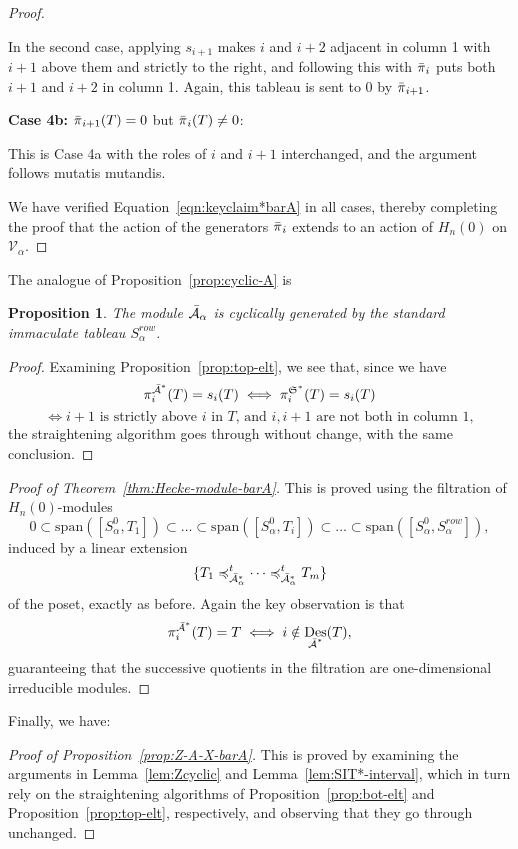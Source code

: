 \documentclass[12pt,letterpaper]{amsart}
\newtheorem{proposition}[theorem]{Proposition}
\theoremstyle{definition}
\newcommand{\dI}{\mathfrak{S}^*}
\DeclareMathOperator{\Des}{Des}
\newcommand{\hn}{H_n(0)}
\begin{document}
\begin{proof}
\begin{enumerate}
In the second case, applying $s_{i+1}$ makes $i$ and $i+2$ adjacent in column 1 with $i+1$ above them and strictly to the right, and following this with $\operatorname{\bar{\pi}}_i$ puts both $i+1$ and $i+2$ in column 1.  Again, this tableau is  sent to 0 by  $\operatorname{\bar{\pi}}_{i+1}$.

\textbf{Case 4b:} $\operatorname{\bar{\pi}}_{i+1}(T)=0$ but $\operatorname{\bar{\pi}}_i(T)\ne 0$:

This is Case 4a with the roles of $i$ and $i+1$ interchanged, and the argument follows mutatis mutandis.


\end{enumerate}
We have verified Equation~\eqref{eqn:keyclaim*barA} in all cases, thereby completing the proof that the action of the generators $\operatorname{\bar{\pi}}_i$ extends to an action of $H_n(0)$ on $\mathcal{V}_\alpha.$ 
\end{proof}    

The analogue of Proposition~\ref{prop:cyclic-A} is 
\begin{proposition}\label{prop:cyclic-barA} The module $\operatorname{\bar{\mathcal{A}}}_\alpha$ is cyclically generated by the standard immaculate tableau $S^{row}_\alpha$.
\end{proposition}
\begin{proof}  Examining  Proposition~\ref{prop:top-elt}, we see that, since we have 
\[\pi_i^{{\bA}^*}(T)=s_i(T)\iff \pi_i^{\dI}(T)=s_i(T)\]
\[\iff i+1 \text{ is strictly above $i$ in $T$, and $i, i+1$ are not both in column 1},\]
the straightening algorithm goes through without change, with the same conclusion.
\end{proof}

\begin{proof}[Proof of Theorem~\ref{thm:Hecke-module-barA}] This is proved using the filtration
of $\hn$-modules 
\[0\subset \mathrm{span}([S^0_\alpha, T_1])
\subset \dots \subset 
\mathrm{span}([S^0_\alpha, T_i])\subset \dots \subset \mathrm{span}([S^0_\alpha, S^{row}_\alpha]),\]
induced by a linear extension 
$$\{{T} _1 \preccurlyeq_{\mathcal{\bar{A}}^\ast _\alpha}^t  \cdots \preccurlyeq_{\mathcal{\bar{A}}^\ast _\alpha} ^t {T} _m  \}$$ 
 of the poset, exactly as before. Again the key observation  is that
 \[\pi_i^{\bA^*}(T)=T\iff i\notin \Des_{\bA^*}(T),\]
 guaranteeing that the successive quotients in the filtration are one-dimensional irreducible modules.
\end{proof}
Finally, we have:
\begin{proof}[Proof of Proposition~\ref{prop:Z-A-X-barA}]
This is proved by examining the  arguments in Lemma~\ref{lem:Zcyclic} and Lemma~\ref{lem:SIT*-interval}, which in turn rely on the straightening algorithms of Proposition~\ref{prop:bot-elt} and Proposition~\ref{prop:top-elt}, respectively, 
and observing that they go through unchanged.\end{proof}
\end{document}
